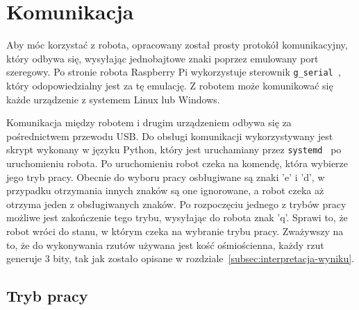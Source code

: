 \chapter{Komunikacja}\label{ch:komunikacja}
Aby móc korzystać z robota, opracowany został prosty protokół komunikacyjny, który 
odbywa się, wysyłając jednobajtowe znaki poprzez emulowany port szeregowy. Po stronie robota Raspberry Pi wykorzystuje 
sterownik \texttt{g\_serial}~\cite{g_serial}, który odopowiedzialny jest za tę emulację. Z robotem może komunikować się 
każde urządzenie z systemem Linux lub Windows. 

Komunikacja między robotem i drugim urządzeniem odbywa się za pośrednictwem przewodu USB.
Do obsługi komunikacji wykorzystywany jest skrypt wykonany w języku Python, który jest uruchamiany 
przez \texttt{systemd}~\cite{systemd} po uruchomieniu robota. Po uruchomieniu robot czeka na komendę, która wybierze jego tryb pracy.
Obecnie do wyboru pracy osbługiwane są znaki 'e' i 'd', w przypadku otrzymania innych znaków są one ignorowane, a robot czeka aż otrzyma jeden z obsługiwanych znaków.
Po rozpoczęciu jednego z trybów pracy możliwe jest zakończenie tego trybu, wysyłając do robota znak 'q'. Sprawi to, że robot wróci do stanu, w którym czeka na wybranie 
trybu pracy. Zważywszy na to, że do wykonywania rzutów używana jest kość ośmiościenna, 
każdy rzut generuje 3 bity, tak jak zostało opisane w rozdziale~\ref{subsec:interpretacja-wyniku}.


\section{Tryb pracy} \label{sec:tryby}

